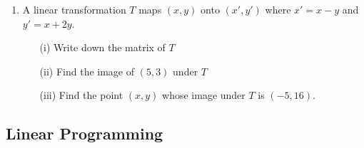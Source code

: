 \begin{enumerate}
	\item A linear transformation $T$ maps $(x,y)$ onto $(x',y')$ where $x' = x - y$ and $y' = x + 2y$.
		\begin{itemize}
		\item[(i)] Write down the matrix of $T$
		\item[(ii)] Find the image of $(5,3)$ under $T$
		\item[(iii)] Find the point $(x,y)$ whose image under $T$ is $(-5,16)$.
		\end{itemize}
	
	
		
	
	
	

\end{enumerate}	
	
	
	
	
	\subsection{Linear Programming}
